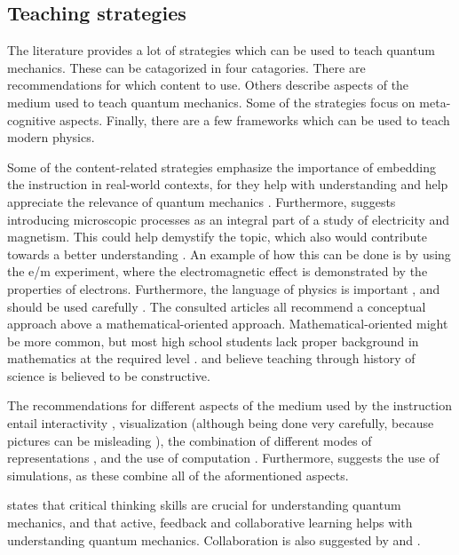 \documentclass[11pt,twoside]{report} %
\begin{document}
\subsection{Teaching strategies}

The literature provides a lot of strategies which can be used to teach quantum mechanics. These can be catagorized in four catagories. There are recommendations for which content to use. Others describe aspects of the medium used to teach quantum mechanics. Some of the strategies focus on meta-cognitive aspects. Finally, there are a few frameworks which can be used to teach modern physics.

Some of the content-related strategies emphasize the importance of embedding the instruction in real-world contexts, for they help with understanding \cite{mckagan,thacker,dori} and help appreciate the relevance of quantum mechanics \cite{barnes, henriksen, mckagan}. Furthermore,  suggests introducing microscopic processes as an integral part of a study of electricity and magnetism. This could help demystify the topic, which also would contribute towards a better understanding \cite{barnes, muller}. An example of how this can be done is by using the e/m experiment, where the electromagnetic effect is demonstrated by the properties of electrons. Furthermore, the language of physics is important \cite{henriksen}, and should be used carefully \cite{mckagan}. The consulted articles all recommend a conceptual approach above a mathematical-oriented approach. Mathematical-oriented might be more common, but most high school students lack proper background in mathematics at the required level \cite{dori}.  and  believe teaching through history of science is believed to be constructive.

The recommendations for different aspects of the medium used by the instruction entail interactivity \cite{adegoke, asikainen, dori, mckagan}, visualization \cite{dori, henriksen, mckagan} (although being done very carefully, because pictures can be misleading \cite{levrini}), the combination of different modes of representations \cite{dori}, and the use of computation \cite{barnes, mckagan, velentzas}. Furthermore,  suggests the use of simulations, as these combine all of the aformentioned aspects.

 states that critical thinking skills are crucial for understanding quantum mechanics, and that active, feedback and collaborative learning helps with understanding quantum mechanics. Collaboration is also suggested by  and . 
\end{document}
